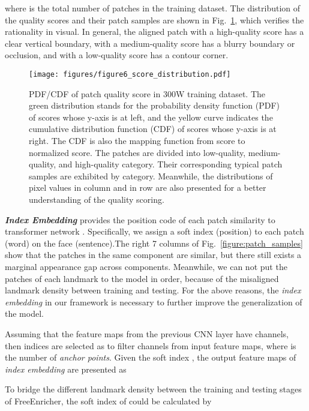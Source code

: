 \documentclass[letterpaper]{article} \usepackage{aaai23}  \usepackage{times}  \usepackage{helvet}  \usepackage{courier}  \usepackage[hyphens]{url}  \usepackage{graphicx} \urlstyle{rm} \def\UrlFont{\rm}  \usepackage{natbib}  \usepackage{caption} \frenchspacing  \setlength{\pdfpagewidth}{8.5in}  \setlength{\pdfpageheight}{11in}  \usepackage{algorithm}
\begin{document}
where  is the total number of patches in the training dataset.
The distribution of the quality scores and their patch samples are shown in Fig.~\ref{figure:score_distribution}, which verifies the rationality in visual.
In general, the aligned patch with a high-quality score has a clear vertical boundary, with a medium-quality score has a blurry boundary or occlusion, and with a low-quality score has a contour corner.

\begin{figure}[h]
\begin{center}
\texttt{[image: figures/figure6\_score\_distribution.pdf]}
\end{center}
   \caption{PDF/CDF of patch quality score in 300W training dataset. The green distribution stands for the probability density function (PDF) of scores whose y-axis is at left, and the yellow curve indicates the cumulative distribution function (CDF) of scores whose y-axis is at right. The CDF is also the mapping function from score to normalized score. The patches are divided into low-quality, medium-quality, and high-quality category. Their corresponding typical patch samples are exhibited by category. Meanwhile, the distributions of pixel values in column and in row are also presented for a better understanding of the quality scoring.}
\label{figure:score_distribution}
\end{figure}

\vspace{5pt}
\noindent\textbf{\emph{Index Embedding}} provides the position code of each patch similarity to transformer network \cite{vaswani2017attention}.
Specifically, we assign a soft index (position) to each patch (word) on the face (sentence).The right 7 columns of Fig.~\ref{figure:patch_samples} show that the patches in the same component are similar, but there still exists a marginal appearance gap across components.
Meanwhile, we can not put the patches of each landmark to the model in order, because of the misaligned landmark density between training and testing.
For the above reasons, the \emph{index embedding} in our framework is necessary to further improve the generalization of the model.

Assuming that the feature maps  from the previous CNN layer have  channels, then  indices are selected as  to filter channels from input feature maps, where  is the number of \emph{anchor points}. Given the soft index , the output feature maps  of \emph{index embedding} are presented as


To bridge the different landmark density between the training and testing stages of FreeEnricher, the soft index  of  could be calculated by
\end{document}
